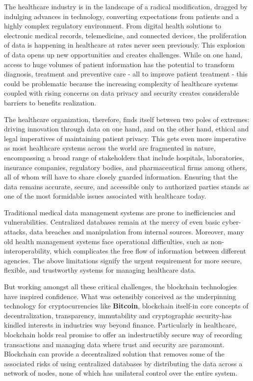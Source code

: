 The healthcare industry is in the landscape of a radical modification, dragged by indulging advances in technology, converting expectations from patients and a highly complex regulatory environment. From digital health solutions to electronic medical records, telemedicine, and connected devices, the proliferation of data is happening in healthcare at rates never seen previously. This explosion of data opens up new opportunities and creates challenges. While on one hand, access to huge volumes of patient information has the potential to transform diagnosis, treatment and preventive care - all to improve patient treatment - this could be problematic because the increasing complexity of healthcare systems coupled with rising concerns on data privacy and security creates considerable barriers to benefits realization.

The healthcare organization, therefore, finds itself between two poles of extremes: driving innovation through data on one hand, and on the other hand, ethical and legal imperatives of maintaining patient privacy. This gets even more imperative as most healthcare systems across the world are fragmented in nature, encompassing a broad range of stakeholders that include hospitals, laboratories, insurance companies, regulatory bodies, and pharmaceutical firms among others, all of whom will have to share closely guarded information. Ensuring that the data remains accurate, secure, and accessible only to authorized parties stands as one of the most formidable issues associated with healthcare today.

Traditional medical data management systems are prone to inefficiencies and vulnerabilities. Centralized databases remain at the mercy of even basic cyber-attacks, data breaches and manipulation from internal sources. Moreover, many old health management systems face operational difficulties, such as non-interoperability, which complicates the free flow of information between different agencies. The above limitations signify the urgent requirement for more secure, flexible, and trustworthy systems for managing healthcare data.

But working amongst all these critical challenges, the blockchain technologies have inspired confidence. What was ostensibly conceived as the underpinning technology for cryptocurrencies like \textbf{Bitcoin}, blockchain itself-in core concepts of decentralization, transparency, immutability  and cryptographic security-has kindled interests in industries way beyond finance. Particularly in healthcare, blockchain holds real promise to offer an indestructibly secure way of recording transactions and managing data where trust and security are paramount. Blockchain can provide a decentralized solution that removes some of the associated risks of using centralized databases by distributing the data across a network of nodes, none of which has unilateral control over the entire system.

